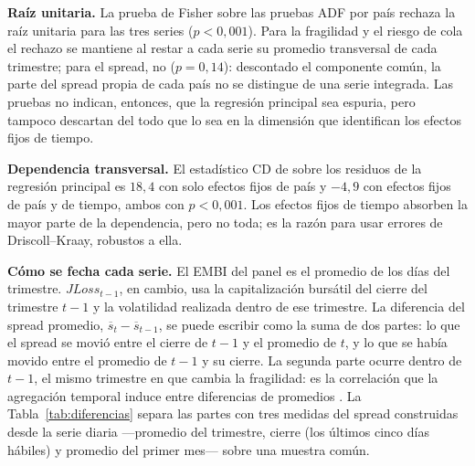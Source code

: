 \textbf{Raíz unitaria.} La prueba de Fisher sobre las pruebas ADF por país \citep{MaddalaWu1999} rechaza la raíz unitaria para las tres series ($p<0{,}001$). Para la fragilidad y el riesgo de cola el rechazo se mantiene al restar a cada serie su promedio transversal de cada trimestre; para el spread, no ($p=0{,}14$): descontado el componente común, la parte del spread propia de cada país no se distingue de una serie integrada. Las pruebas no indican, entonces, que la regresión principal sea espuria, pero tampoco descartan del todo que lo sea en la dimensión que identifican los efectos fijos de tiempo.

\textbf{Dependencia transversal.} El estadístico CD de \citet{Pesaran2004} sobre los residuos de la regresión principal es $18{,}4$ con solo efectos fijos de país y $-4{,}9$ con efectos fijos de país y de tiempo, ambos con $p<0{,}001$. Los efectos fijos de tiempo absorben la mayor parte de la dependencia, pero no toda; es la razón para usar errores de Driscoll--Kraay, robustos a ella.

\textbf{Cómo se fecha cada serie.} El EMBI del panel es el promedio de los días del trimestre. $JLoss_{t-1}$, en cambio, usa la capitalización bursátil del cierre del trimestre $t-1$ y la volatilidad realizada dentro de ese trimestre. La diferencia del spread promedio, $\overline{s}_t-\overline{s}_{t-1}$, se puede escribir como la suma de dos partes: lo que el spread se movió entre el cierre de $t-1$ y el promedio de $t$, y lo que se había movido entre el promedio de $t-1$ y su cierre. La segunda parte ocurre dentro de $t-1$, el mismo trimestre en que cambia la fragilidad: es la correlación que la agregación temporal induce entre diferencias de promedios \citep{Working1960}. La Tabla~\ref{tab:diferencias} separa las partes con tres medidas del spread construidas desde la serie diaria ---promedio del trimestre, cierre (los últimos cinco días hábiles) y promedio del primer mes--- sobre una muestra común.


